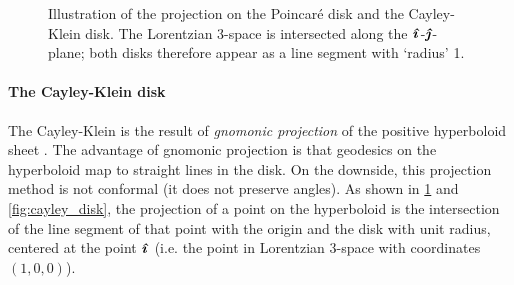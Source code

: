 \begin{figure}[ht!]
    \centering
    
    \caption{Illustration of the projection on the Poincaré disk and the Cayley-Klein disk. The Lorentzian 3-space is intersected along the $\quati$-$\quatj$-plane; both disks therefore appear as a line segment with `radius' 1.}
    \label{fig:hyperboloid_projection}
\end{figure}

\paragraph{The Cayley-Klein disk} The Cayley-Klein is the result of \emph{gnomonic projection} of the positive hyperboloid sheet \cite{Benedetti1992}. The advantage of gnomonic projection is that geodesics on the hyperboloid map to straight lines in the disk. On the downside, this projection method is not conformal (it does not preserve angles). As shown in \cref{fig:hyperboloid_projection} and \cref{fig:cayley_disk}, the projection of a point on the hyperboloid is the intersection of the line segment of that point with the origin and the disk with unit radius, centered at the point \(\quati\) (i.e. the point in Lorentzian 3-space with coordinates \((1, 0, 0)\)). 
